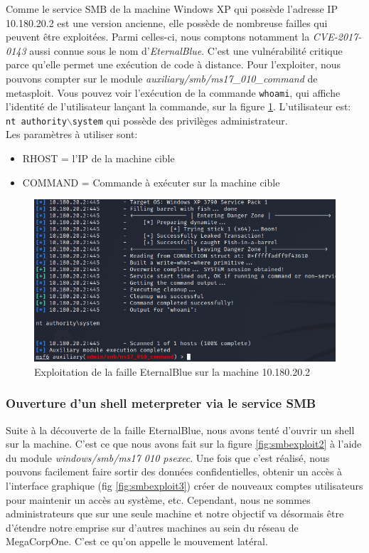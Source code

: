 \documentclass[french,paper=a4,oneside,captions=tableheading]{article}
\begin{document}
Comme le service SMB de la machine Windows XP qui possède l'adresse IP 10.180.20.2 est une version ancienne, elle possède de nombreuse failles qui peuvent être exploitées. Parmi celles-ci, nous comptons notamment la \textit{CVE-2017-0143} aussi connue sous le nom d'\textit{EternalBlue}. C'est une vulnérabilité critique parce qu'elle permet une exécution de code à distance. Pour l'exploiter, nous pouvons compter sur le module \textit{auxiliary/smb/ms17\_010\_command} de metasploit. Vous pouvez voir l'exécution de la commande \texttt{whoami}, qui affiche l'identité de l'utilisateur lançant la commande, sur la figure \ref{fig:smbexploit}. L'utilisateur est: \texttt{nt authority$\backslash$system} qui possède des privilèges administrateur.\\
Les paramètres à utiliser sont:
\begin{itemize}
    \item RHOST = l'IP de la machine cible
    \item COMMAND = Commande à exécuter sur la machine cible
\end{itemize}

\begin{figure}[H]
    \centering
    \includegraphics[width=0.80\linewidth]{images/smb-exploit.png}
    \caption{Exploitation de la faille EternalBlue sur la machine 10.180.20.2}
    \label{fig:smbexploit}
\end{figure}



\subsubsection{Ouverture d'un shell meterpreter via le service SMB}

Suite à la découverte de la faille EternalBlue, nous avons tenté d'ouvrir un shell sur la machine. C'est ce que nous avons fait sur la figure \ref{fig:smbexploit2} à l'aide du module \textit{windows/smb/ms17 010 psexec}. Une fois que c'est réalisé, nous pouvons facilement faire sortir des données confidentielles, obtenir un accès à l'interface graphique (fig \ref{fig:smbexploit3}) créer de nouveaux comptes utilisateurs pour maintenir un accès au système, etc. Cependant, nous ne sommes administrateurs que sur une seule machine et notre objectif va désormais être d'étendre notre emprise sur d'autres machines au sein du réseau de MegaCorpOne. C'est ce qu'on appelle le mouvement latéral.
\end{document}
